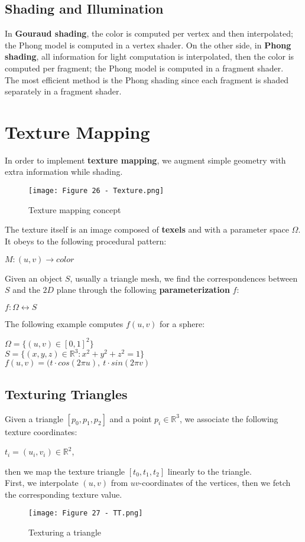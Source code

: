 \documentclass{article}
\begin{document}
\subsection{Shading and Illumination}
In \textbf{Gouraud shading}, the color is computed per vertex and then interpolated; the Phong model is computed in a vertex shader. On the other side, in \textbf{Phong shading}, all information for light computation is interpolated, then the color is computed per fragment; the Phong model is computed in a fragment shader. \\ 
The most efficient method is the Phong shading since each fragment is shaded separately in a fragment shader.

\newpage

\section{Texture Mapping}
In order to implement \textbf{texture mapping}, we augment simple geometry with extra information while shading.
\begin{figure}[H]
    \centering
    \texttt{[image: Figure 26 - Texture.png]}
    \caption{Texture mapping concept}
\end{figure}
The texture itself is an image composed of \textbf{texels} and with a parameter space $\Omega$. It obeys to the following procedural pattern:
\begin{center}
    $M:(u,v) \rightarrow color$
\end{center}
Given an object $S$, usually a triangle mesh, we find the correspondences between $S$ and the $2D$ plane through the following \textbf{parameterization} $f$:
\begin{center}
    $f : \Omega \leftrightarrow S$
\end{center}
The following example computes $f(u,v)$ for a sphere:
\begin{center}
    $\Omega = \{(u,v)\in [0,1]^2\}$ \\
    \vspace{0.1cm}
    $S = \{(x,y,z) \in \mathbb{R}^3:x^2 + y^2 + z^2 = 1\}$ \\
    \vspace{0.1cm}
    $f(u,v) = (t \cdot cos(2\pi u), \ t \cdot sin(2\pi v)$
\end{center}
\subsection{Texturing Triangles}
Given a triangle $[p_0, p_1, p_2]$ and a point $p_i \in \mathbb{R}^3$, we associate the following texture coordinates:
\begin{center}
    $t_i =(u_i,v_i) \in \mathbb{R}^2$,
\end{center}
then we map the texture triangle $[t_0, t_1, t_2]$ linearly to the triangle. \\
First, we interpolate $(u,v)$ from $uv$-coordinates of the vertices, then we fetch the corresponding texture value.
\begin{figure}[H]
    \centering
    \texttt{[image: Figure 27 - TT.png]}
    \caption{Texturing a triangle}
\end{figure}
\end{document}

